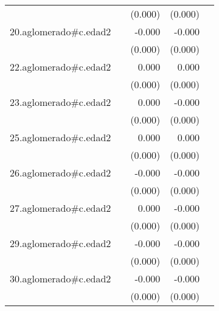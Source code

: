 {\begin{longtable}{l*{4}{D{.}{.}{-1}}}
            &                     &     (0.000)         &     (0.000)         &                     \\
\addlinespace
20.aglomerado#c.edad2&                     &      -0.000\sym{*}  &      -0.000\sym{***}&                     \\
            &                     &     (0.000)         &     (0.000)         &                     \\
\addlinespace
22.aglomerado#c.edad2&                     &       0.000         &       0.000         &                     \\
            &                     &     (0.000)         &     (0.000)         &                     \\
\addlinespace
23.aglomerado#c.edad2&                     &       0.000         &      -0.000         &                     \\
            &                     &     (0.000)         &     (0.000)         &                     \\
\addlinespace
25.aglomerado#c.edad2&                     &       0.000         &       0.000         &                     \\
            &                     &     (0.000)         &     (0.000)         &                     \\
\addlinespace
26.aglomerado#c.edad2&                     &      -0.000         &      -0.000\sym{*}  &                     \\
            &                     &     (0.000)         &     (0.000)         &                     \\
\addlinespace
27.aglomerado#c.edad2&                     &       0.000         &      -0.000         &                     \\
            &                     &     (0.000)         &     (0.000)         &                     \\
\addlinespace
29.aglomerado#c.edad2&                     &      -0.000         &      -0.000\sym{*}  &                     \\
            &                     &     (0.000)         &     (0.000)         &                     \\
\addlinespace
30.aglomerado#c.edad2&                     &      -0.000         &      -0.000\sym{***}&                     \\
            &                     &     (0.000)         &     (0.000)         &                     \\

\end{longtable}}
